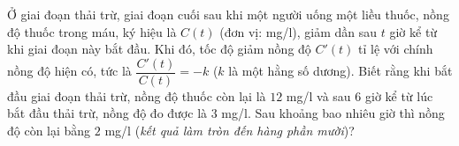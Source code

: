 \begin{ex}%
	Ở giai đoạn thải trừ, giai đoạn cuối sau khi một người uống một liều thuốc, nồng độ thuốc trong máu, ký hiệu là $C(t)$ (đơn vị: mg/l), giảm dần sau $t$ giờ kể từ khi giai đoạn này bắt đầu. Khi đó, tốc độ giảm nồng độ $C'(t)$ tỉ lệ với chính nồng độ hiện có, tức là $\dfrac{C'(t)}{C(t)}=-k$ ($k$ là một hằng số dương). Biết rằng khi bắt đầu giai đoạn thải trừ, nồng độ thuốc còn lại là $12$ mg/l và sau $6$ giờ kể từ lúc bắt đầu thải trừ, nồng độ đo được là $3$ mg/l. Sau khoảng bao nhiêu giờ thì nồng độ còn lại bằng $2$ mg/l ({\it kết quả làm tròn đến hàng phần mười})?
	\par
\end{ex}

